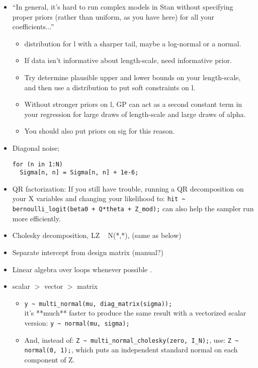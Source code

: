 \documentclass{article}
\begin{document}
        \begin{itemize}
        \item ``In general, it's hard to run complex models in Stan without specifying proper priors (rather than uniform, as you have here) for all your coefficients...'' \citep{Trangucci}    
        \begin{itemize}
        \item distribution for l with a sharper tail, maybe a log-normal or a normal. 
        \item If data isn't informative about length-scale, need informative prior. 
        \item Try determine plausible upper and lower bounds on your length-scale, and then use a distribution to put soft constraints on l. 
        \item Without stronger priors on l, GP can act as a second constant term in your regression for large draws of length-scale and large draws of alpha. 
        \item You should also put priors on sig for this reason. 
        \end{itemize}

\item Diagonal noise; \citep{Trangucci2017}
\begin{verbatim}
for (n in 1:N)
  Sigma[n, n] = Sigma[n, n] + 1e-6;
\end{verbatim}

\item QR factorization: If you still have trouble, running a QR decomposition on your X variables and changing your likelihood to:
\verb|hit ~ bernoulli_logit(beta0 + Q*theta + Z_mod);|
can also help the sampler run more efficiently. \citep{Trangucci}
\item Cholesky decomposition, LZ ~ N(*,*), (same as below)
\item Separate intercept from design matrix (manual?)
\item Linear algebra over loops whenever possible \citep{StantheMAN}.

\item scalar $>$ vector $>$ matrix \citep{Carpenter}
      \begin{itemize}
      \item \verb|y ~ multi_normal(mu, diag_matrix(sigma));| \\
      it's **much** faster to produce the same result with a vectorized scalar version: \verb|y ~ normal(mu, sigma);| \\
      \item And, instead of: \verb|Z ~ multi_normal_cholesky(zero, I_N);|, use: \verb|Z ~ normal(0, 1);|, which puts an independent standard normal on each component of Z.
      \end{itemize}

\end{itemize}
\end{document}

